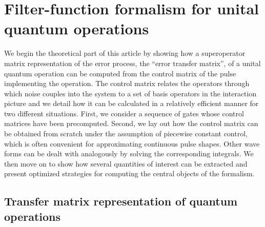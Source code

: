 \chapter{Filter-function formalism for unital quantum operations}\label{ch:ff:theory}
We begin the theoretical part of this article by showing how a superoperator matrix representation of the error process, the \enquote{error transfer matrix}, of a unital quantum operation can be computed from the control matrix of the pulse implementing the operation.
The control matrix relates the operators through which noise couples into the system to a set of basis operators in the interaction picture and we detail how it can be calculated in a relatively efficient manner for two different situations.
First, we consider a sequence of gates whose control matrices have been precomputed.
Second, we lay out how the control matrix can be obtained from scratch under the assumption of piecewise constant control, which is often convenient for approximating continuous pulse shapes.
Other wave forms can be dealt with analogously by solving the corresponding integrals.
We then move on to show how several quantities of interest can be extracted and present optimized strategies for computing the central objects of the formalism.

\section{Transfer matrix representation of quantum operations}\label{sec:ff:theory:transfer_matrix}
